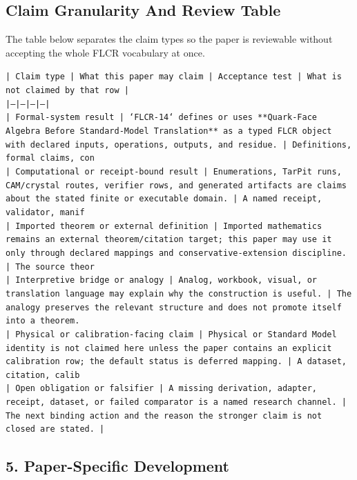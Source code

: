 \documentclass[11pt]{article}
\begin{document}
\subsection*{Claim Granularity And Review Table}

The table below separates the claim types so the paper is reviewable without accepting the whole FLCR vocabulary at once.

\noindent\texttt{| Claim type | What this paper may claim | Acceptance test | What is not claimed by that row |}\\
\noindent\texttt{|---|---|---|---|}\\
\noindent\texttt{| Formal-system result | `FLCR-14` defines or uses **Quark-Face Algebra Before Standard-Model Translation** as a typed FLCR object with declared inputs, operations, outputs, and residue. | Definitions, formal claims, con}\\
\noindent\texttt{| Computational or receipt-bound result | Enumerations, TarPit runs, CAM/crystal routes, verifier rows, and generated artifacts are claims about the stated finite or executable domain. | A named receipt, validator, manif}\\
\noindent\texttt{| Imported theorem or external definition | Imported mathematics remains an external theorem/citation target; this paper may use it only through declared mappings and conservative-extension discipline. | The source theor}\\
\noindent\texttt{| Interpretive bridge or analogy | Analog, workbook, visual, or translation language may explain why the construction is useful. | The analogy preserves the relevant structure and does not promote itself into a theorem. }\\
\noindent\texttt{| Physical or calibration-facing claim | Physical or Standard Model identity is not claimed here unless the paper contains an explicit calibration row; the default status is deferred mapping. | A dataset, citation, calib}\\
\noindent\texttt{| Open obligation or falsifier | A missing derivation, adapter, receipt, dataset, or failed comparator is a named research channel. | The next binding action and the reason the stronger claim is not closed are stated. | }\\

\subsection*{5. Paper-Specific Development}
\end{document}
